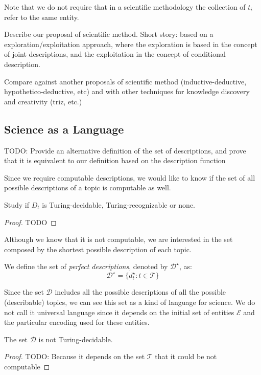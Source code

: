 Note that we do not require that in a scientific methodology the collection of $t_i$ refer to the same entity.


{\color{red} Describe our proposal of scientific method. Short story: based on a exploration/exploitation approach, where the exploration is based in the concept of joint descriptions, and the exploitation in the concept of conditional description.}

{\color{red} Compare against another proposals of scientific method (inductive-deductive, hypothetico-deductive, etc) and with other techniques for knowledge discovery and creativity (triz, etc.)}

\subsection{Science as a Language}

{\color{red} TODO: Provide an alternative definition of the set of descriptions, and prove that it is equivalent to our definition based on the description function}

Since we require computable descriptions, we would like to know if the set of all possible descriptions of a topic is computable as well.

\begin{proposition}
Study if $D_{t}$ is Turing-decidable, Turing-recognizable or none.
\end{proposition}
\begin{proof}
{\color{red} TODO}
\end{proof}

Although we know that it is not computable, we are interested in the set composed by the shortest possible description of each topic.

\begin{definition}
We define the set of \emph{perfect descriptions}, denoted by $\mathcal{D}^\star$, as:
\[
\mathcal{D}^\star = \{ d_t^\star : t \in \mathcal{T} \}
\]
\end{definition}

Since the set $\mathcal{D}$ includes all the possible descriptions of all the possible (describable) topics, we can see this set as a kind of language for science. We do not call it universal language since it depends on the initial set of entities $\mathcal{E}$ and the particular encoding used for these entities.

\begin{proposition}
The set $\mathcal{D}$ is not Turing-decidable.
\end{proposition}
\begin{proof}
{\color{red} TODO: Because it depends on the set $\mathcal{T}$ that it could be not computable}
\end{proof}

